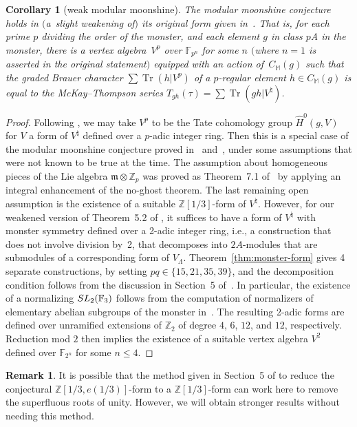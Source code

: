 \documentclass[11pt]{article}
\newcommand{\bF}{\mathbb{F}}
\newcommand{\bM}{\mathbb{M}}
\newcommand{\bZ}{\mathbb{Z}}
\newcommand{\fm}{\mathfrak{m}}
\DeclareMathOperator{\Tr}{Tr}
\newtheorem{cor}[thm]{Corollary}
\theoremstyle{definition}
\newtheorem{rem}[thm]{Remark}
\begin{document}
\begin{cor}[weak modular moonshine]\label{cor:weak-modular-moonshine}
The modular moonshine conjecture holds in \linebreak $($a~slight weakening of$)$ its original form given in~{\rm \cite{R96}}. That is, for each prime $p$ dividing the order of the monster, and each element $g$ in class $p$A in the monster, there is a vertex algebra~$V^p$ over $\bF_{p^n}$ for some $n$ $($where $n=1$ is asserted in the original statement$)$ equipped with an action of~$C_\bM(g)$ such that the graded Brauer character $\sum \Tr(h|V^p)$ of a $p$-regular element $h \in C_\bM(g)$ is equal to the McKay--Thompson series $T_{gh}(\tau) = \sum \Tr(gh|V^\natural)$.
\end{cor}
\begin{proof}Following \cite{BR96}, we may take $V^p$ to be the Tate cohomology group $\hat{H}^0(g,V)$ for $V$ a form of $V^\natural$ defined over a $p$-adic integer ring. Then this is a special case of the modular moonshine conjecture proved in~\cite{BR96} and~\cite{B98}, under some assumptions that were not known to be true at the time. The assumption about homogeneous pieces of the Lie algebra $\fm \otimes \bZ_p$ was proved as Theorem~7.1 of~\cite{B99} by applying an integral enhancement of the no-ghost theorem. The last remaining open assumption is the existence of a suitable $\bZ[1/3]$-form of $V^\natural$. However, for our weakened version of Theorem~5.2 of \cite{BR96}, it suffices to have a form of $V^\natural$ with monster symmetry defined over a 2-adic integer ring, i.e., a construction that does not involve division by~2, that decomposes into $2A$-modules that are submodules of a corresponding form of $V_\Lambda$. Theorem~\ref{thm:monster-form} gives 4 separate constructions, by setting $pq \in \{ 15, 21, 35, 39 \}$, and the decomposition condition follows from the discussion in Section~5 of~\cite{BR96}. In particular, the existence of a normalizing ${\rm SL}_2(\bF_3)$ follows from the computation of normalizers of elementary abelian subgroups of the monster in~\cite{W88}. The resulting 2-adic forms are defined over unramified extensions of $\bZ_2$ of degree $4$, $6$, $12$, and $12$, respectively. Reduction mod $2$ then implies the existence of a suitable vertex algebra $V^2$ defined over $\bF_{2^n}$ for some $n \leq 4$.
\end{proof}

\begin{rem}It is possible that the method given in Section~5 of \cite{BR96} to reduce the conjectural $\bZ[1/3,e(1/3)]$-form to a $\bZ[1/3]$-form can work here to remove the superfluous roots of unity. However, we will obtain stronger results without needing this method.
\end{rem}
\end{document}

